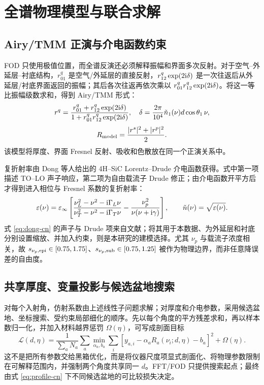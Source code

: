 \documentclass[10pt,a4paper]{ctexart}
\begin{document}
\section{全谱物理模型与联合求解}
\subsection{Airy/TMM 正演与介电函数约束}
FOD 只使用极值位置，而全谱反演还必须解释振幅和界面多次反射。对于空气--外延层--衬底结构，$r^q_{01}$ 是空气/外延层的直接反射，$r^q_{12}\exp(2{\rm i}\delta)$ 是一次往返后从外延层/衬底界面返回的振幅；其后各次往返再依次乘以 $r^q_{01}r^q_{12}\exp(2{\rm i}\delta)$。将这一等比振幅级数求和，得到 Airy/TMM 形式\cite{Troparevsky2010}：
\begin{equation}
r^q=\frac{r^q_{01}+r^q_{12}\exp(2{\rm i}\delta)}
{1+r^q_{01}r^q_{12}\exp(2{\rm i}\delta)},\quad
\delta=\frac{2\pi}{10^4}\tilde n_1(\nu)d\cos\theta_1\,\nu,
\end{equation}
\begin{equation}
R_{\rm model}=\frac{|r^s|^2+|r^p|^2}{2}.
\label{eq:tmm-cn}
\end{equation}
该模型将厚度、界面 Fresnel 反射、吸收和色散放在同一个正演关系中。

复折射率由 Dong 等人给出的 4H--SiC Lorentz--Drude 介电函数获得\cite{Dong2012}。式中第一项描述 TO--LO 声子响应，第二项为自由载流子 Drude 修正；由介电函数开平方后才得到进入相位与 Fresnel 系数的复折射率：
\begin{equation}
\varepsilon(\nu)=\varepsilon_\infty\left[
\frac{\nu_L^2-\nu^2-{\rm i}\Gamma_L\nu}
{\nu_T^2-\nu^2-{\rm i}\Gamma_T\nu}
-\frac{\nu_p^2}{\nu(\nu+{\rm i}\gamma)}
\right],\qquad \tilde n(\nu)=\sqrt{\varepsilon(\nu)}.
\label{eq:dong-cn}
\end{equation}
式 \eqref{eq:dong-cn} 的声子与 Drude 项来自文献；将其用于本数据、为外延层和衬底分别设置缩放、并加入约束，则是本研究的建模选择。尤其 $\nu_p$ 与载流子浓度相关，故 $s_{\nu_p,\rm epi}\in[0.75,1.75]$、$s_{\nu_p,\rm sub}\in[0.75,1.25]$ 被作为物理边界，而非任意降误差的自由度。

\subsection{共享厚度、变量投影与候选盆地搜索}
对每个入射角，仿射系数由上述线性子问题求解；对厚度和介电参数，采用候选盆地、坐标搜索、受约束局部细化的顺序。先以每个角度的平方残差求和，再以样本数归一化，并加入材料越界惩罚 $\Omega(\eta)$，可写成剖面目标
\begin{equation}
\mathcal L(d,\eta)=
\frac{1}{\sum_aN_a}\sum_a
\min_{\alpha_a,b_a}\sum_i
\left[y_{a,i}-\alpha_aR_a(\nu_i;d,\eta)-b_a\right]^2+\Omega(\eta).
\label{eq:profile-cn}
\end{equation}
这不是把所有参数交给黑箱优化，而是将仪器尺度项显式剖面化、将物理参数限制在可解释范围内，并强制两个角度共享同一 $d$。FFT/FOD 只提供搜索起点；最终由式 \eqref{eq:profile-cn} 下不同候选盆地的可比较损失决定。
\end{document}
